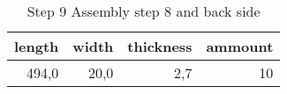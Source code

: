 \begin{table}[h!]
\centering
\caption{Step 9 Assembly step 8 and back side}
\begin{tabular}{rrrr}
\toprule
 length &  width &  thickness &  ammount \\
\midrule
  494,0 &   20,0 &        2,7 &       10 \\
\bottomrule
\end{tabular}
\end{table}
